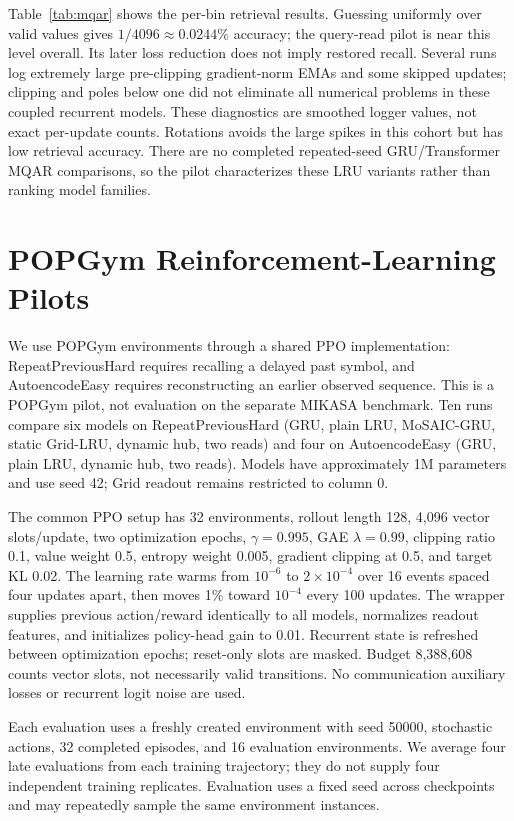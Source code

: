 \documentclass[letterpaper,twoside]{article}
\begin{document}
Table~\ref{tab:mqar} shows the per-bin retrieval results. Guessing uniformly over valid values gives $1/4096\approx0.0244\%$ accuracy; the query-read pilot is near this level overall. Its later loss reduction does not imply restored recall. Several runs log extremely large pre-clipping gradient-norm EMAs and some skipped updates; clipping and poles below one did not eliminate all numerical problems in these coupled recurrent models. These diagnostics are smoothed logger values, not exact per-update counts. Rotations avoids the large spikes in this cohort but has low retrieval accuracy. There are no completed repeated-seed GRU/Transformer MQAR comparisons, so the pilot characterizes these LRU variants rather than ranking model families.

\section{POPGym Reinforcement-Learning Pilots}\label{app:rl}

We use POPGym \citep{morad2023popgym} environments through a shared PPO implementation: RepeatPreviousHard requires recalling a delayed past symbol, and AutoencodeEasy requires reconstructing an earlier observed sequence. This is a POPGym pilot, not evaluation on the separate MIKASA benchmark. Ten runs compare six models on RepeatPreviousHard (GRU, plain LRU, MoSAIC-GRU, static Grid-LRU, dynamic hub, two reads) and four on AutoencodeEasy (GRU, plain LRU, dynamic hub, two reads). Models have approximately 1M parameters and use seed 42; Grid readout remains restricted to column 0.

The common PPO \citep{schulman2017ppo} setup has 32 environments, rollout length 128, 4,096 vector slots/update, two optimization epochs, $\gamma=0.995$, GAE \citep{schulman2016gae} $\lambda=0.99$, clipping ratio 0.1, value weight 0.5, entropy weight 0.005, gradient clipping at 0.5, and target KL 0.02. The learning rate warms from $10^{-6}$ to $2\times10^{-4}$ over 16 events spaced four updates apart, then moves 1\% toward $10^{-4}$ every 100 updates. The wrapper supplies previous action/reward identically to all models, normalizes readout features, and initializes policy-head gain to 0.01. Recurrent state is refreshed between optimization epochs; reset-only slots are masked. Budget 8,388,608 counts vector slots, not necessarily valid transitions. No communication auxiliary losses or recurrent logit noise are used.

Each evaluation uses a freshly created environment with seed 50000, stochastic actions, 32 completed episodes, and 16 evaluation environments. We average four late evaluations from each training trajectory; they do not supply four independent training replicates. Evaluation uses a fixed seed across checkpoints and may repeatedly sample the same environment instances.
\end{document}
